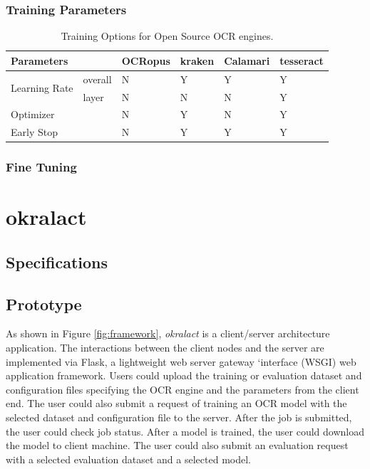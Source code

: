 \documentclass[conference]{IEEEtran}
\begin{document}
\subsubsection*{Training Parameters}

\begin{table}[bt]
\begin{tabular}{llllll}
\hline
Parameters & & OCRopus     & kraken                      & Calamari & tesseract\\ \hline
\multirow{2}{*}{Learning Rate}& overall & N & Y & Y & Y\\ 
&layer & N & N  & N & Y \\
\hline
Optimizer &  &  N & Y & N & Y \\\hline
Early Stop & & N & Y & Y & Y \\\hline
\end{tabular}
\caption{Training Options for Open Source OCR engines.}
\label{tab:training_options}
\end{table}
\subsubsection*{Fine Tuning}
\section*{okralact}

\subsection*{Specifications}


\subsection*{Prototype}     
As shown in Figure \ref{fig:framework}, \textit{okralact} is a client/server architecture application. The interactions between the client nodes and the server are implemented via Flask, a lightweight web server gateway `interface (WSGI) web application framework. Users could upload the training or evaluation dataset and configuration files specifying the OCR engine and the parameters from the client end. The user could also submit a request of training an OCR model with the selected dataset and configuration file to the server. After the job is submitted, the user could check job status. After a model is trained, the user could download the model to client machine. The user could also submit an evaluation request with a selected evaluation dataset and a selected model.
\end{document}
